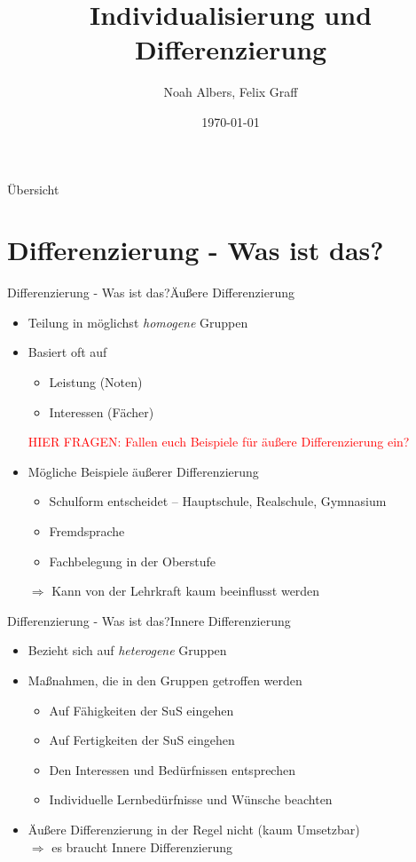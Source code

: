 \documentclass{beamer}
\title{Individualisierung und Differenzierung}
\author{Noah Albers, Felix Graff}
\institute{Uni Münster}
\date{\today}
\newcommand{\teacher}[1]{\textcolor{red}{#1}}
\newcommand{\ppause}{}
\begin{document}
	
	\frame{\titlepage}
	
	\begin{frame}{Übersicht}
		\tableofcontents
	\end{frame}
	
	\section{Differenzierung - Was ist das?}
	
	\begin{frame}[t]{Differenzierung - Was ist das?}{Äußere Differenzierung}
		\begin{itemize}
			\ppause
			\item Teilung in möglichst \textit{homogene} Gruppen
			\ppause
			\item Basiert oft auf
			\ppause
			\begin{itemize}
				\item Leistung (Noten)
				\ppause
				\item Interessen (Fächer)
			\end{itemize}
			
			\teacher{HIER FRAGEN: Fallen euch Beispiele für äußere Differenzierung ein?}
			\ppause
			
			\item Mögliche Beispiele äußerer Differenzierung
			\begin{itemize}
				\ppause
				\item Schulform entscheidet – Hauptschule, Realschule, Gymnasium
				\ppause
				\item Fremdsprache
				\ppause
				\item Fachbelegung in der Oberstufe
			\end{itemize}
			
			\ppause
			$\Rightarrow$ Kann von der Lehrkraft kaum beeinflusst werden
		\end{itemize}
	\end{frame}
	
	\begin{frame}[t]{Differenzierung - Was ist das?}{Innere Differenzierung}
		\begin{itemize}
			\ppause
			\item Bezieht sich auf \textit{heterogene} Gruppen
			\ppause
			\item Maßnahmen, die in den Gruppen getroffen werden
			\ppause
			\begin{itemize}
				\item Auf Fähigkeiten der SuS eingehen
				\ppause
				\item Auf Fertigkeiten der SuS eingehen
				\ppause
				\item Den Interessen und Bedürfnissen entsprechen
				\ppause
				\item Individuelle Lernbedürfnisse und Wünsche beachten
				\ppause
			\end{itemize}
			
			\item Äußere Differenzierung in der Regel nicht (kaum Umsetzbar)\\
			\ppause
			$\Rightarrow$ es braucht Innere Differenzierung
		\end{itemize}
	\end{frame}
	
\end{document}
